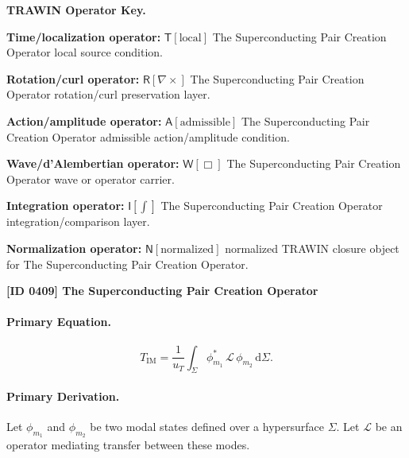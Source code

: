 \par\vspace{0.45\baselineskip}
\noindent\begin{minipage}[t]{\linewidth}
\begingroup
\small
\raggedright
\textbf{TRAWIN Operator Key.}\par
\noindent\textbf{Time/localization operator:} $\mathsf{T}\!\left[\mathrm{local}\right]$ The Superconducting Pair Creation Operator local source condition.\par
\noindent\textbf{Rotation/curl operator:} $\mathsf{R}\!\left[\nabla\times\right]$ The Superconducting Pair Creation Operator rotation/curl preservation layer.\par
\noindent\textbf{Action/amplitude operator:} $\mathsf{A}\!\left[\mathrm{admissible}\right]$ The Superconducting Pair Creation Operator admissible action/amplitude condition.\par
\noindent\textbf{Wave/d'Alembertian operator:} $\mathsf{W}\!\left[\Box\right]$ The Superconducting Pair Creation Operator wave or operator carrier.\par
\noindent\textbf{Integration operator:} $\mathsf{I}\!\left[\int\right]$ The Superconducting Pair Creation Operator integration/comparison layer.\par
\noindent\textbf{Normalization operator:} $\mathsf{N}\!\left[\mathrm{normalized}\right]$ normalized TRAWIN closure object for The Superconducting Pair Creation Operator.\par
\endgroup
\end{minipage}

\clearpage
\noindent\textbf{[ID 0409] The Superconducting Pair Creation Operator}\par
\vspace{0.35em}
\paragraph{Primary Equation.}
\begin{equation}
T_{\mathrm{IM}}
=
\frac{1}{u_T}
\int_{\Sigma}
\phi_{m_1}^{*}
\,\mathcal{L}\,
\phi_{m_2}
\,\mathrm{d}\Sigma .
\end{equation}

\paragraph{Primary Derivation.}
Let $\phi_{m_1}$ and $\phi_{m_2}$ be two modal states defined over a hypersurface $\Sigma$.  
Let $\mathcal{L}$ be an operator mediating transfer between these modes.

